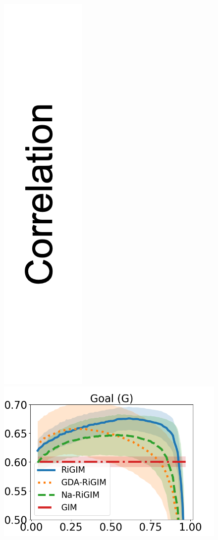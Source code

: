 \documentclass[letterpaper]{article} %
\begin{document}
\begin{figure}[htbp]
    \begin{minipage}{0.01\textwidth}
    \centering
    \includegraphics[scale=0.12]{figures/correlation_y_label.png}
    \end{minipage}
    \begin{minipage}{0.16\textwidth}
    \centering
    \includegraphics[scale=0.14]{figures/soccer_risk_curve_Goals_shadow.png}\par

\end{minipage}
\end{figure}
\end{document}
